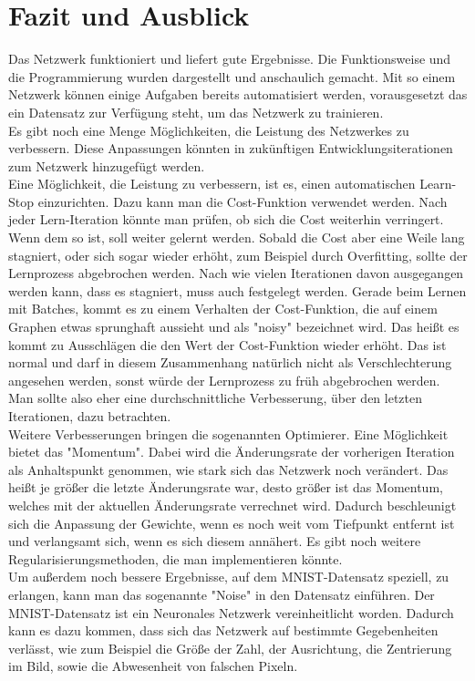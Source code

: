\documentclass[12pt]{article}
\begin{document}
\section{Fazit und Ausblick}
Das Netzwerk funktioniert und liefert gute Ergebnisse. Die Funktionsweise und die Programmierung wurden dargestellt und anschaulich gemacht.
Mit so einem Netzwerk können einige Aufgaben bereits automatisiert werden, vorausgesetzt das ein Datensatz zur Verfügung steht, um das Netzwerk zu trainieren.\\
Es gibt noch eine Menge Möglichkeiten, die Leistung des Netzwerkes zu verbessern. Diese Anpassungen könnten in zukünftigen Entwicklungsiterationen zum Netzwerk hinzugefügt werden.\\
Eine Möglichkeit, die Leistung zu verbessern, ist es, einen automatischen Learn-Stop einzurichten. Dazu kann man die Cost-Funktion verwendet werden. Nach jeder Lern-Iteration könnte man prüfen, ob sich die Cost weiterhin verringert. Wenn dem so ist, soll weiter gelernt werden. Sobald die Cost aber eine Weile lang stagniert, oder sich sogar wieder erhöht, zum Beispiel durch Overfitting, sollte der Lernprozess abgebrochen werden. Nach wie vielen Iterationen davon ausgegangen werden kann, dass es stagniert, muss auch festgelegt werden. Gerade beim Lernen mit Batches, kommt es zu einem Verhalten der Cost-Funktion, die auf einem Graphen etwas sprunghaft aussieht und als "noisy" bezeichnet wird. Das heißt es kommt zu Ausschlägen die den Wert der Cost-Funktion wieder erhöht. Das ist normal und darf in diesem Zusammenhang natürlich nicht als Verschlechterung angesehen werden, sonst würde der Lernprozess zu früh abgebrochen werden. Man sollte also eher eine durchschnittliche Verbesserung, über den letzten Iterationen, dazu betrachten.\\
Weitere Verbesserungen bringen die sogenannten Optimierer. Eine Möglichkeit bietet das "Momentum". Dabei wird die Änderungsrate der vorherigen Iteration als Anhaltspunkt genommen, wie stark sich das Netzwerk noch verändert. Das heißt je größer die letzte Änderungsrate war, desto größer ist das Momentum, welches mit der aktuellen Änderungsrate verrechnet wird. Dadurch beschleunigt sich die Anpassung der Gewichte, wenn es noch weit vom Tiefpunkt entfernt ist und verlangsamt sich, wenn es sich diesem annähert. Es gibt noch weitere Regularisierungsmethoden, die man implementieren könnte.\\
Um außerdem noch bessere Ergebnisse, auf dem MNIST-Datensatz speziell, zu erlangen, kann man das sogenannte "Noise" in den Datensatz einführen. Der MNIST-Datensatz ist ein Neuronales Netzwerk vereinheitlicht worden. Dadurch kann es dazu kommen, dass sich das Netzwerk auf bestimmte Gegebenheiten verlässt, wie zum Beispiel die Größe der Zahl, der Ausrichtung, die Zentrierung im Bild, sowie die Abwesenheit von falschen Pixeln.\\
\end{document}
